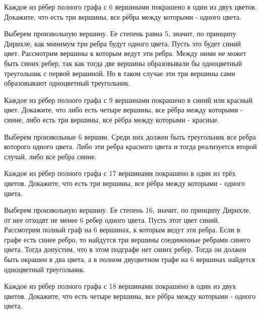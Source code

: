 \documentclass[11pt, a4paper]{template}
\begin{document}
\begin{exercise}
Каждое из рёбер полного графа с 6 вершинами покрашено в один из двух цветов. Докажите, что есть три вершины, все рёбра между которыми - одного цвета.
\end{exercise}

\begin{solution}
Выберем произвольную вершину. Ее степень равна 5, значит, по принципу Дирихле, как минимум три ребра будут одного цвета. Пусть это будет синий цвет. Рассмотрим вершины к которым ведут эти ребра. Между ними не может быть синих ребер, так как тогда две вершины образовывали бы одноцветный треугольник с первой вершиной. Но в таком случае эти три вершины сами образовывают одноцветный треугольник. 
\end{solution}

\begin{exercise}
Каждое из рёбер полного графа с 9 вершинами покрашено в синий или красный цвет. Докажите, что либо есть четыре вершины, все рёбра между которыми - синие, либо есть три вершины, все рёбра между которыми - красные.
\end{exercise}

\begin{solution}
Выберем произвольные 6 вершин. Среди них должен быть треугольник все ребра которого одного цвета. Либо эти ребра красного цвета и тогда реализуется второй случай, либо все ребра синие. 
\end{solution}

\begin{exercise}
Каждое из рёбер полного графа с 17 вершинами покрашено в один из трёх цветов. Докажите, что есть три вершины, все рёбра между которыми - одного цвета.
\end{exercise}

\begin{solution}
Выберем произвольную вершину. Ее степень 16, значит, по принципу Дирихле, от нее отходят не менее 6 ребер одного цвета. Пусть этот цвет синий. Рассмотрим полный граф на 6 вершинах, к которым ведут эти ребра. Если в графе есть синее ребро, то найдутся три вершины соединенные ребрами синего цвета. Тогда допустим, что в этом подграфе нет синих ребер. Тогда он должен быть окрашен в два цвета, а в полном двуцветном графе на 6 вершинах найдется одноцветный треугольник.
\end{solution}

\begin{exercise}
Каждое из рёбер полного графа с 18 вершинами покрашено в один из двух цветов. Докажите, что есть четыре вершины, все рёбра между которыми - одного цвета.
\end{exercise}
\end{document}
